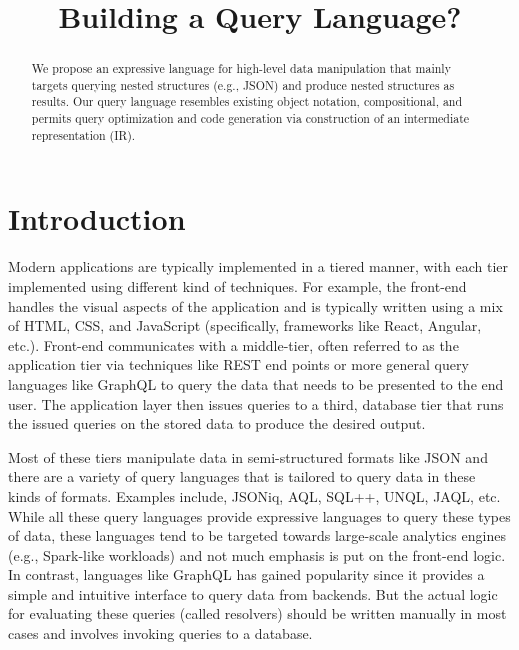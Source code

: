 \documentclass[runningheads]{llncs}
\begin{document}
%
\title{Building a Query Language?}

%
%
%
\maketitle              %
%
\begin{abstract}
We propose an expressive language for high-level data manipulation that
mainly targets querying nested structures (e.g., JSON) and produce nested
structures as results.
Our query language resembles existing object notation, compositional, and
permits query optimization and code generation via construction of an
intermediate representation (IR).


\end{abstract}
%
%
%
\section{Introduction}

Modern applications are typically implemented in a tiered manner, with each tier implemented
using different kind of techniques.
For example, the front-end handles the visual aspects of the application and is typically
written using a mix of HTML, CSS, and JavaScript (specifically, frameworks like
React, Angular, etc.). 
Front-end communicates with a middle-tier, often referred to as the
application tier via techniques like REST end points or more general query languages like
GraphQL to query the data that needs to be presented to the end user.
The application layer then issues queries to a third, database tier that runs the issued
queries on the stored data to produce the desired output.

Most of these tiers manipulate data in semi-structured formats like JSON
and there are a variety of query languages that is tailored to query data in these kinds of
formats.
Examples include, JSONiq, AQL, SQL++, UNQL, JAQL, etc.
While all these query languages provide expressive languages to query these
types of data, these languages tend to be targeted towards large-scale
analytics engines (e.g., Spark-like workloads) and not much emphasis is put
on the front-end logic.
In contrast, languages like GraphQL has gained popularity since it provides
a simple and intuitive interface to query data from backends.
But the actual logic for evaluating these queries (called resolvers) should be
written manually in most cases and involves invoking queries to a database.
\end{document}
